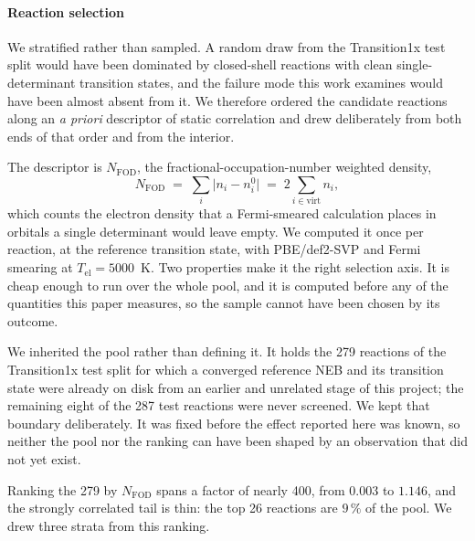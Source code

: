 
\paragraph{Reaction selection}

We stratified rather than sampled. A random draw from the Transition1x test
split would have been dominated by closed-shell reactions with clean
single-determinant transition states, and the failure mode this work examines
would have been almost absent from it. We therefore ordered the candidate
reactions along an \emph{a priori} descriptor of static correlation and drew
deliberately from both ends of that order and from the interior.

The descriptor is $N_\mathrm{FOD}$, the fractional-occupation-number weighted
density,
%
\begin{equation}
  N_\mathrm{FOD} \;=\; \sum_i \bigl| n_i - n_i^{0} \bigr|
  \;=\; 2 \sum_{i \in \mathrm{virt}} n_i ,
\end{equation}
%
which counts the electron density that a Fermi-smeared calculation places in
orbitals a single determinant would leave empty. We computed it once per
reaction, at the reference transition state, with PBE/def2-SVP and Fermi
smearing at $T_\mathrm{el} = 5000$~K. Two properties make it the right
selection axis. It is cheap enough to run over the whole pool, and it is
computed before any of the quantities this paper measures, so the sample cannot
have been chosen by its outcome.

We inherited the pool rather than defining it. It holds the 279 reactions of
the Transition1x test split for which a converged reference NEB and its
transition state were already on disk from an earlier and unrelated stage of
this project; the remaining eight of the 287 test reactions were never
screened. We kept that boundary deliberately. It was fixed before the effect
reported here was known, so neither the pool nor the ranking can have been
shaped by an observation that did not yet exist.

Ranking the 279 by $N_\mathrm{FOD}$ spans a factor of nearly 400, from $0.003$
to $1.146$, and the strongly correlated tail is thin: the top 26 reactions are
$9\,\%$ of the pool. We drew three strata from this ranking.

